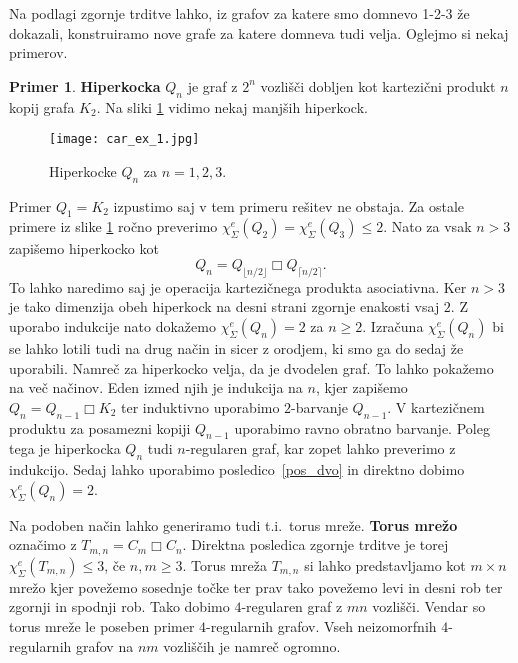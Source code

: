 \documentclass[12pt,a4paper,twoside]{article}
\theoremstyle{definition} %
\newtheorem{primer}[definicija]{Primer}
\theoremstyle{plain} %
\newcommand{\ec}{\chi_{\Sigma}^e}
\numberwithin{equation}{section}  %
\DeclareMathOperator{\cart}{\Box}
\begin{document}
Na podlagi zgornje trditve lahko, iz grafov za katere smo domnevo 1-2-3 že dokazali, konstruiramo nove grafe za katere domneva tudi velja. Oglejmo si nekaj primerov.
\begin{primer}
\textbf{Hiperkocka} $Q_n$ je graf z $2^n$ vozlišči dobljen kot kartezični produkt $n$ kopij grafa $K_2$. Na sliki \ref{hip} vidimo nekaj manjših hiperkock.
 \begin{figure}[h!]
\caption{Hiperkocke $Q_n$ za $n=1,2,3$.}
\label{hip}
\centering
    \texttt{[image: car\_ex\_1.jpg]}
    \end{figure}
Primer $Q_1 = K_2$ izpustimo saj v tem primeru rešitev ne obstaja. Za ostale primere iz slike \ref{hip}  ročno preverimo $\ec(Q_2) = \ec(Q_3) \le 2.$ Nato za vsak $n > 3$ zapišemo hiperkocko kot
 $$Q_n = Q_{\lfloor n/2 \rfloor}  \cart Q_{\lceil n/2 \rceil}.$$
 To lahko naredimo saj je operacija kartezičnega produkta asociativna. Ker $n > 3$ je tako dimenzija obeh hiperkock na desni strani zgornje enakosti vsaj $2$. Z uporabo indukcije nato dokažemo $\ec(Q_n) = 2$ za $ n \ge 2$. Izračuna $\ec(Q_n)$ bi se lahko lotili tudi na drug način in sicer z orodjem, ki smo ga do sedaj že uporabili. Namreč za hiperkocko velja, da je dvodelen graf. To lahko pokažemo na več načinov.  Eden izmed njih je indukcija na $n$, kjer zapišemo $Q_n = Q_{n-1}  \cart K_2$ ter induktivno uporabimo $2$-barvanje $Q_{n-1}$. V kartezičnem produktu za posamezni kopiji $Q_{n-1}$ uporabimo ravno obratno barvanje. Poleg tega je hiperkocka $Q_n$ tudi $n$-regularen graf, kar zopet lahko preverimo z indukcijo. Sedaj lahko uporabimo posledico~\ref{pos_dvo} in direktno dobimo $\ec(Q_n) = 2$.

Na podoben način lahko generiramo tudi t.i.\ torus mreže. \textbf{Torus mrežo} označimo z $T_{m,n} = C_m  \cart C_n$. Direktna posledica zgornje trditve je torej $\ec(T_{m,n}) \le 3$, če $n,m \ge 3$. Torus mreža $T_{m,n}$ si lahko predstavljamo kot $m \times n$ mrežo kjer povežemo sosednje točke ter prav tako povežemo levi in desni rob ter zgornji in spodnji rob. Tako dobimo $4$-regularen graf z $mn$ vozlišči. Vendar so torus mreže le poseben primer $4$-regularnih grafov. Vseh neizomorfnih $4$-regularnih grafov na $nm$ vozliščih je namreč ogromno.
\end{primer}




 
\end{document}
